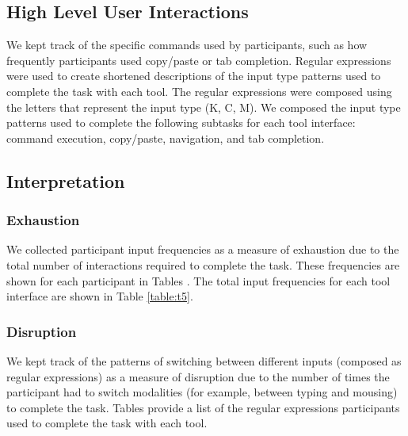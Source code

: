 \documentclass[11pt, oneside]{article}   	%
\begin{document}
\begin{comment}
\begin{table}
 \centering
  \begin{tabular}{ | c | c | c | }
  \hline
  Computer Input Measures & kubectl CLI & OpenShift Console \\ 
  \hline
  Commands Entered & & \\ 
  \hline
  Clicks & & \\ 
  \hline
  Mouse Movements & & \\ 
  \hline
  \end{tabular}
 \caption{.}
 \label{table:t}
\end{table}
\end{comment}

\subsection{High Level User Interactions}
We kept track of the specific commands used by participants, such as how frequently participants used copy/paste or tab completion. Regular expressions were used to create shortened descriptions of the input type patterns used to complete the task with each tool. The regular expressions were composed using the letters that represent the input type (K, C, M). We composed the input type patterns used to complete the following subtasks for each tool interface: command execution, copy/paste, navigation, and tab completion. 

\subsection{Interpretation}
\subsubsection{Exhaustion}
We collected participant input frequencies as a measure of exhaustion due to the total number of interactions required to complete the task. These frequencies are shown for each participant in Tables \text{\ref{table:t1}--\ref{table:t4}}. The total input frequencies for each tool interface are shown in Table \ref{table:t5}.

\subsubsection{Disruption}
We kept track of the patterns of switching between different inputs (composed as regular expressions) as a measure of disruption due to the number of times the participant had to switch modalities (for example, between typing and mousing) to complete the task. Tables \text{\ref{table:t6}--\ref{table:t9}} provide a list of the regular expressions participants used to complete the task with each tool.
\end{document}
